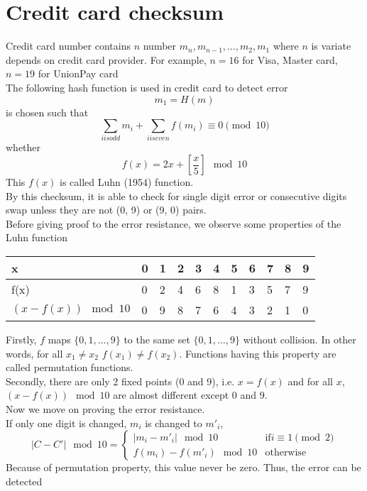\chapter{Credit card checksum}
Credit card number contains $n$ number $m_n, m_{n-1}, \ldots, m_2, m_1$ where $n$ is variate depends on credit card provider. For example, $n = 16$ for Visa, Master card, $n = 19$ for UnionPay card\\
The following hash function is used in credit card to detect error\\
$$m_1 = H(m)$$ is chosen such that
$$
\sum_{i is odd}m_i + \sum_{i is even}f(m_i) \equiv 0 \pmod{10}
$$
whether
$$
f(x) = 2x + \left[\frac{x}{5}\right] \mod 10
$$
This $f(x)$ is called Luhn (1954) function.\\
By this checksum, it is able to check for single digit error or consecutive digits swap unless they are not (0, 9) or (9, 0) pairs.\\

Before giving proof to the error resistance, we observe some properties of the Luhn function\\

\begin{tabular}{| l | l | l | l | l | l | l | l | l | l | l |}
\hline
x & 0 & 1 & 2 & 3 & 4 & 5 & 6 & 7 & 8 & 9\\
\hline
f(x) & 0 & 2 & 4 & 6 & 8 & 1 & 3 & 5 & 7 & 9\\
\hline
$(x - f(x)) \mod 10$ & 0 & 9 & 8 & 7 & 6 & 4 & 3 & 2 & 1 & 0\\
\hline
\end{tabular}

Firstly, $f$ maps $\{0,1,\ldots,9\}$ to the same set $\{0,1,\ldots,9\}$ without collision. In other words, for all $x_1 \neq x_2$ $f(x_1) \neq f(x_2)$. Functions having this property are called permutation functions.\\

Secondly, there are only 2 fixed points (0 and 9), i.e. $x = f(x)$ and for all $x$, $(x - f(x)) \mod 10$ are almost different except 0 and 9.\\

Now we move on proving the error resistance.\\

If only one digit is changed, $m_i$ is changed to $m'_i$,
$$
|C - C'| \mod 10 =
\begin{cases}
|m_i - m'_i| \mod 10 &\text{if} i \equiv 1 \pmod{2}
\\
f(m_i) - f(m'_i) \mod 10 &\text{otherwise}
\end{cases}
$$
Because of permutation property, this value never be zero. Thus, the error can be detected\\

